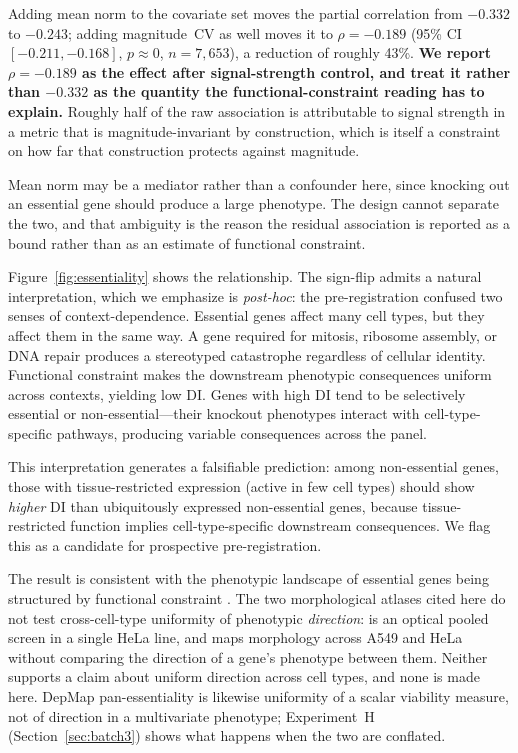 \documentclass[11pt]{article}
\begin{document}
Adding mean norm to the covariate set moves the partial correlation from
$-0.332$ to $-0.243$; adding magnitude~CV as well moves it to
$\rho = -0.189$ (95\% CI $[-0.211, -0.168]$, $p \approx 0$, $n = 7{,}653$), a
reduction of roughly 43\%.  \textbf{We report $\rho = -0.189$ as the effect
after signal-strength control, and treat it rather than $-0.332$ as the
quantity the functional-constraint reading has to explain.}  Roughly half of
the raw association is attributable to signal strength in a metric that is
magnitude-invariant by construction, which is itself a constraint on how far
that construction protects against magnitude.

Mean norm may be a mediator rather than a confounder here, since knocking out
an essential gene should produce a large phenotype.  The design cannot separate
the two, and that ambiguity is the reason the residual association is reported
as a bound rather than as an estimate of functional constraint.

Figure~\ref{fig:essentiality} shows the relationship.
The sign-flip admits a natural interpretation, which we emphasize
is \emph{post-hoc}: the pre-registration confused two senses of
context-dependence.  Essential genes affect many cell types, but they
affect them in the same way.  A gene required for mitosis, ribosome
assembly, or DNA repair produces a stereotyped catastrophe regardless of
cellular identity.  Functional constraint makes the downstream
phenotypic consequences uniform across contexts, yielding low DI.  Genes
with high DI tend to be selectively essential or non-essential---their
knockout phenotypes interact with cell-type-specific pathways,
producing variable consequences across the panel.

This interpretation generates a falsifiable prediction: among
non-essential genes, those with tissue-restricted expression (active in
few cell types) should show \emph{higher} DI than ubiquitously expressed
non-essential genes, because tissue-restricted function implies
cell-type-specific downstream consequences.  We flag this as a candidate
for prospective pre-registration.

The result is consistent with the phenotypic landscape of essential genes being
structured by functional constraint \citep{hart2015crispr, meyers2017crispr}.
The two morphological atlases cited here do not test cross-cell-type uniformity
of phenotypic \emph{direction}: \citet{funk2022phenotypic} is an optical pooled
screen in a single HeLa line, and \citet{ramezani2025periscope} maps morphology
across A549 and HeLa without comparing the direction of a gene's phenotype
between them.  Neither supports a claim about uniform direction across cell
types, and none is made here.  DepMap pan-essentiality is likewise uniformity
of a scalar viability measure, not of direction in a multivariate phenotype;
Experiment~H (Section~\ref{sec:batch3}) shows what happens when the two are
conflated.
\end{document}
